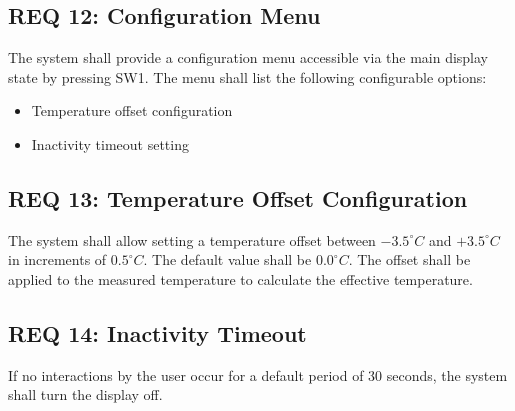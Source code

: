 \subsection*{REQ 12: Configuration Menu}
\label{subsec:REQ 12: Configuration Menu}
The system shall provide a configuration menu accessible via the main display state by pressing SW1. The menu shall list the following configurable options:
\begin{itemize}
    \item Temperature offset configuration
    \item Inactivity timeout setting
\end{itemize}

\subsection*{REQ 13: Temperature Offset Configuration}
\label{subsec:REQ 13: Temperature Offset Configuration}
The system shall allow setting a temperature offset between $-3.5^\circ C$ and $+3.5^\circ C$ in increments of $0.5^\circ C$. The default value shall be $0.0^\circ C$. The offset shall be applied to the measured temperature to calculate the effective temperature.

\subsection*{REQ 14: Inactivity Timeout}
\label{subsec:REQ 14: Inactivity Timeout}
If no interactions by the user occur for a default period of 30 seconds, the system shall turn the display off.

